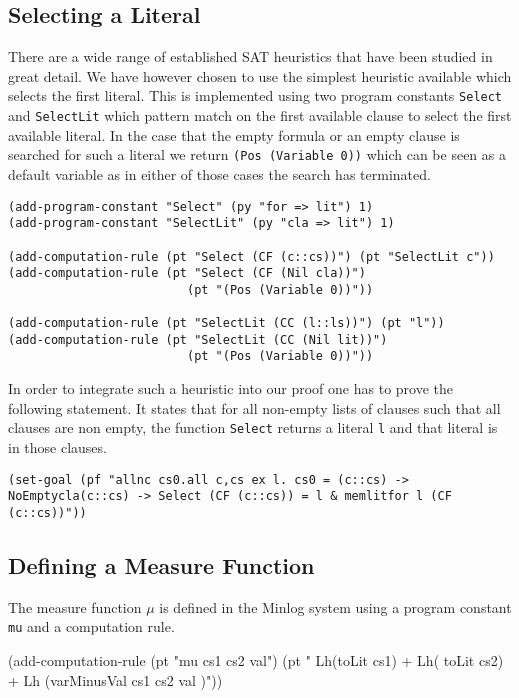 \subsection*{Selecting a Literal}
There are a wide range of established SAT heuristics that have been studied in great detail. We have however chosen to use the simplest heuristic available which selects the first literal. This is implemented using two program constants \texttt{Select} and \texttt{SelectLit} which pattern match on the first available clause to select the first available literal. In the case that the empty formula or an empty clause is searched for such a literal we return \texttt{(Pos (Variable 0))} which can be seen as a default variable as in either of those cases the search has terminated. 

\begin{lstlisting}[caption = The Literal Selection Function]
(add-program-constant "Select" (py "for => lit") 1)
(add-program-constant "SelectLit" (py "cla => lit") 1)

(add-computation-rule (pt "Select (CF (c::cs))") (pt "SelectLit c"))
(add-computation-rule (pt "Select (CF (Nil cla))")  
                         (pt "(Pos (Variable 0))")) 

(add-computation-rule (pt "SelectLit (CC (l::ls))") (pt "l"))
(add-computation-rule (pt "SelectLit (CC (Nil lit))") 
                         (pt "(Pos (Variable 0))"))
\end{lstlisting}

In order to integrate such a heuristic into our proof one has to prove the following statement. It states that for all non-empty lists of clauses such that all clauses are non empty, the function \texttt{Select} returns a literal \texttt{l} and that literal is in those clauses.

\begin{center}
\texttt{(set-goal (pf "allnc cs0.all c,cs ex l. cs0 = (c::cs) -> NoEmptycla(c::cs) -> Select (CF (c::cs)) = l \& memlitfor l (CF (c::cs))"))}
\end{center}


\subsection{Defining a Measure Function}
The measure function $\mu$ is defined in the Minlog system using a program constant \texttt{mu} and a computation rule.

(add-computation-rule (pt "mu cs1 cs2 val") (pt " Lh(toLit cs1) + Lh( toLit cs2) + Lh (varMinusVal cs1 cs2 val )"))

